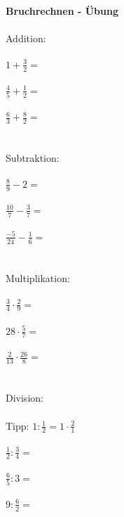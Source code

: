 


  \textbf{Bruchrechnen -  Übung}\\\\
  Addition:\\\\
  $1+\frac{3}{2}=$\\\\
  $\frac{4}{5}+\frac{1}{2}=$\\\\
  $\frac{6}{3}+\frac{8}{2}=$\\\\
  \\ \noindent Subtraktion:\\\\
  $\frac{8}{9}-2=$\\\\
  $\frac{10}{7}-\frac{3}{7}=$\\\\
  $\frac{-5}{24}-\frac{1}{6}=$\\\\
  \\ \noindent Multiplikation:\\\\
  $\frac{3}{4}\cdot\frac{2}{9}=$\\\\
  $28\cdot\frac{5}{7}=$\\\\
  $\frac{2}{13}\cdot\frac{26}{8}=$\\\\
  \\ \noindent Division:\\\\
  \noindent Tipp: \;\;\;\;\;
  $1 : \frac{1}{2}=1\cdot\frac{2}{1}$\\\\
  $\frac{1}{2}:\frac{3}{4}=$\\\\
  $\frac{6}{5}:3=$\\\\
  $9:\frac{6}{2}=$\\\\

